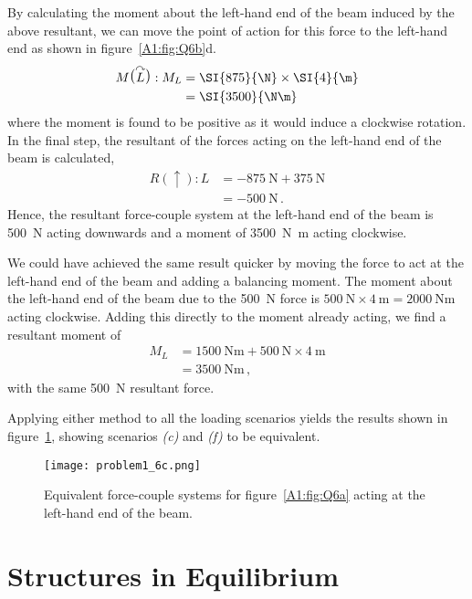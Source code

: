\documentclass[a4paper,justified,oneside]{tufte-handout}
\numberwithin{equation}{subsection}
\begin{document}
\begin{solution}
By calculating the moment about the left-hand end of the beam induced by the above resultant, we can move the point of action for this force to the left-hand end as shown in figure~\ref{A1:fig:Q6b}d.
\begin{align*}
		M\raisebox{1.5pt}{\big(}\overset{\curvearrowright}{L}\raisebox{1.5pt}{\big)}: M_L	&=	\SI{875}{\N} \times \SI{4}{\m}	\\
																							&=	\SI{3500}{\N\m} \,
\end{align*}
where the moment is found to be positive as it would induce a clockwise rotation. In the final step, the resultant of the forces acting on the left-hand end of the beam is calculated,
\begin{align*}
	R\left(\uparrow\right): L	&=	\SI{-875}{\N} + \SI{375}{\N}	\\
								&=	\SI{-500}{\N} \,.
\end{align*}
Hence, the resultant force-couple system at the left-hand end of the beam is \SI{500}{\N} acting downwards and a moment of \SI{3500}{\N\m} acting clockwise.

We could have achieved the same result quicker by moving the force to act at the left-hand end of the beam and adding a balancing moment. The moment about the left-hand end of the beam due to the \SI{500}{\N} force is $\SI{500}{\N}\times\SI{4}{\m}=\SI{2000}{\N\m}$ acting clockwise. Adding this directly to the moment already acting, we find a resultant moment of 
\begin{align*}
	M_L	&=	\SI{1500}{\N\m}	+	\SI{500}{\N}\times\SI{4}{\m}	\\	
		&=	\SI{3500}{\N\m} \,,
\end{align*}
with the same \SI{500}{\N} resultant force.

Applying either method to all the loading scenarios yields the results shown in figure~\ref{A1:fig:Q6c}, showing scenarios \textit{(c)} and \textit{(f)} to be equivalent.
\begin{figure}
	\centering
	\texttt{[image: problem1\_6c.png]}
	\caption{Equivalent force-couple systems for figure~\protect\ref{A1:fig:Q6a} acting at the left-hand end of the beam.}
	\label{A1:fig:Q6c}
\end{figure}
\end{solution}

\clearpage
\section{Structures in Equilibrium}
\end{document}
